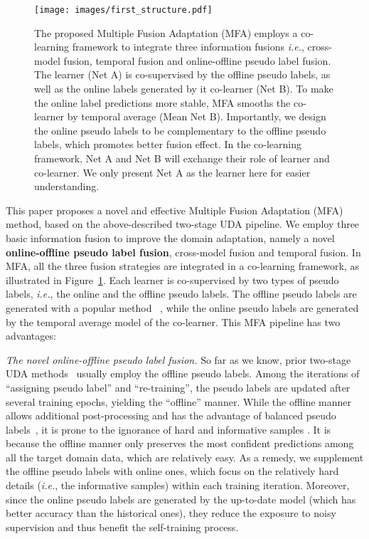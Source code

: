 \documentclass{bmvc2k}
\begin{document}
\begin{figure}
\begin{center}
\texttt{[image: images/first\_structure.pdf]}
\end{center}
\vspace{-20pt}
\caption{The proposed Multiple Fusion Adaptation (MFA) employs a co-learning framework to integrate three information fusions \emph{i.e.}, cross-model fusion, temporal fusion and online-offline pseudo label fusion. The learner (Net A) is co-supervised by the offline pseudo labels, as well as the online labels generated by it co-learner (Net B). To make the online label predictions more stable, MFA smooths the co-learner by temporal average (Mean Net B). Importantly, we design the online pseudo labels to be complementary to the offline pseudo labels, which promotes better fusion effect. In the co-learning framework, Net A and Net B will exchange their role of learner and co-learner. We only present Net A as the learner here for easier understanding. 
}
\label{fig: intro}
\end{figure}




This paper proposes a novel and effective Multiple Fusion Adaptation (MFA) method, based on the above-described two-stage UDA pipeline. We employ three basic information fusion to improve the domain adaptation, namely a novel \textbf{online-offline pseudo label fusion}, cross-model fusion and temporal fusion. In MFA, all the three fusion strategies are integrated in a co-learning framework, as illustrated in Figure~\ref{fig: intro}. Each learner is co-supervised by two types of pseudo labels, \emph{i.e.}, the online and the offline pseudo labels. The offline pseudo labels are generated with a popular method ~\cite{RN162}, while the online pseudo labels are generated by the temporal average model of the co-learner. This MFA pipeline has two advantages:


 \emph{The novel online-offline pseudo label fusion.} So far as we know, prior two-stage UDA methods~\cite{RN180,RN132} usually employ the offline pseudo labels. Among the iterations of ``assigning pseudo label'' and ``re-training'', the pseudo labels are updated after several training epochs, yielding the ``offline'' manner. While the offline manner allows additional post-processing and has the advantage of balanced pseudo labels~\cite{RN162}, it is prone to the ignorance of hard and informative samples \cite{RN204}. It is because the offline manner only preserves the most confident predictions among all the target domain data, which are relatively easy. As a remedy, we supplement the offline pseudo labels with online ones, which focus on the relatively hard details (\emph{i.e.}, the informative samples) within each training iteration. Moreover, since the online pseudo labels are generated by the up-to-date model (which has better accuracy than the historical ones), they reduce the exposure to noisy supervision and thus benefit the self-training process. 
\end{document}
